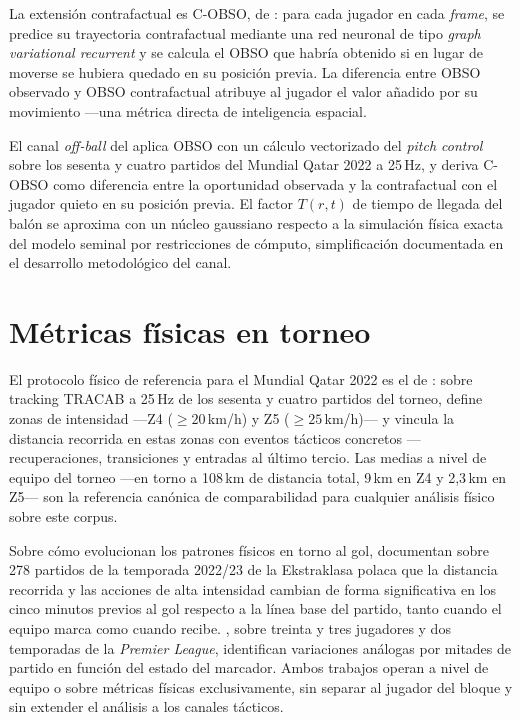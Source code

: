 La extensión contrafactual es C-OBSO, de \textcite{Teranishi2022COBSO}:
para cada jugador en cada \textit{frame}, se predice su trayectoria
contrafactual mediante una red neuronal de tipo \textit{graph variational
recurrent} y se calcula el OBSO que habría obtenido si en lugar de
moverse se hubiera quedado en su posición previa. La diferencia entre
OBSO observado y OBSO contrafactual atribuye al jugador el valor
añadido por su movimiento ---una métrica directa de inteligencia
espacial.

El canal \textit{off-ball} del \CCV aplica OBSO con un cálculo
vectorizado del \textit{pitch control} sobre los sesenta y cuatro
partidos del Mundial Qatar 2022 a 25\,Hz, y deriva C-OBSO como
diferencia entre la oportunidad observada y la contrafactual con el
jugador quieto en su posición previa. El factor $T(r, t)$ de tiempo de
llegada del balón se aproxima con un núcleo gaussiano respecto a la
simulación física exacta del modelo seminal por restricciones de
cómputo, simplificación documentada en el desarrollo metodológico del
canal.


\section{Métricas físicas en torneo}
\label{sec:sota-fisico}

El protocolo físico de referencia para el Mundial Qatar 2022 es el de
\textcite{Bradley2024Qatar}: sobre tracking TRACAB a 25\,Hz de los
sesenta y cuatro partidos del torneo, define zonas de intensidad
---Z4 ($\geq 20$\,km/h) y Z5 ($\geq 25$\,km/h)--- y vincula la
distancia recorrida en estas zonas con eventos tácticos concretos
---recuperaciones, transiciones y entradas al último tercio. Las
medias a nivel de equipo del torneo ---en torno a 108\,km de distancia
total, 9\,km en Z4 y 2{,}3\,km en Z5--- son la referencia canónica de
comparabilidad para cualquier análisis físico sobre este corpus.

Sobre cómo evolucionan los patrones físicos en torno al gol,
\textcite{Konefal2024} documentan sobre 278 partidos de la temporada
2022/23 de la Ekstraklasa polaca que la distancia recorrida y las
acciones de alta intensidad cambian de forma significativa en los cinco
minutos previos al gol respecto a la línea base del partido, tanto
cuando el equipo marca como cuando recibe. \textcite{Morgans2025},
sobre treinta y tres jugadores y dos temporadas de la \textit{Premier
League}, identifican variaciones análogas por mitades de partido en
función del estado del marcador. Ambos trabajos operan a nivel de
equipo o sobre métricas físicas exclusivamente, sin separar al jugador
del bloque y sin extender el análisis a los canales tácticos.

